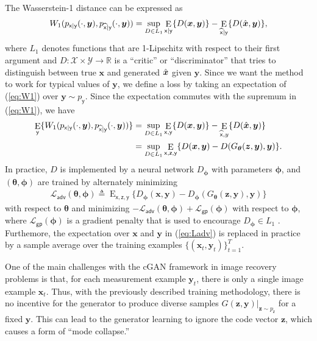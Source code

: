 \documentclass{article}
\theoremstyle{plain}
\theoremstyle{definition}
\theoremstyle{remark}
\renewcommand{\hat}{\widehat}
\newcommand{\defn}{\triangleq}
\newcommand{\hvec}[1]{\ensuremath{\Hat{\boldsymbol{#1}}}}
\renewcommand{\vec}[1]{\ensuremath{\boldsymbol{#1}}}
\newcommand{\mc}[1]{\ensuremath{\mathcal{#1}}}
\newcommand{\Real}{{\mathbb{R}}}
\DeclareMathOperator{\E}{E}
\renewcommand{\eqref}[1]{(\ref{eq:#1})}
\newcommand{\py}{p_{\mathsf{y}}}
\newcommand{\pxgy}{p_{\mathsf{x}|\mathsf{y}}}
\newcommand{\pz}{p_{\mathsf{z}}}
\newcommand{\pxhgy}{p_{\hat{\mathsf{x}}|\mathsf{y}}}
\newcommand{\Ey}{\E_{\mathsf{y}}}
\newcommand{\Exgy}{\E_{\mathsf{x}|\mathsf{y}}}
\newcommand{\Exy}{\E_{\mathsf{x,y}}}
\newcommand{\Exhgy}{\E_{\hat{\mathsf{x}}|\mathsf{y}}}
\newcommand{\Egy}{\E_{\hat{\mathsf{x}},y}}
\newcommand{\Exzy}{\E_{\mathsf{x,z,y}}}
\newcommand{\Ladv}{\mc{L}_{\mathsf{adv}}}
\newcommand{\Lgp}{\mc{L}_{\mathsf{gp}}}
\begin{document}
The Wasserstein-1 distance can be expressed as %
\begin{align}
W_1(\pxgy(\cdot,\vec{y}),\pxhgy(\cdot,\vec{y})) = \sup_{D\in L_1} \Exgy\{D(\vec{x},\vec{y})\} - \Exhgy\{D(\hvec{x},\vec{y})\}
\label{eq:W1},
\end{align}
where $L_1$ denotes functions that are 1-Lipschitz with respect to their first argument and $D:\mc{X}\times\mc{Y}\rightarrow \Real$ is a ``critic'' or ``discriminator'' that tries to distinguish between true $\vec{x}$ and generated $\hvec{x}$ given $\vec{y}$.
Since we want the method to work for typical values of $\vec{y}$, we define a loss by taking an expectation of \eqref{W1} over $\vec{y}\sim\py$.
Since the expectation commutes with the supremum in \eqref{W1},
we have \cite{Adler:18}
\begin{align}
\Ey\{W_1(\pxgy(\cdot,\vec{y}),\pxhgy(\cdot,\vec{y}))\} &= \sup_{D\in L_1} \Exy\{D(\vec{x},\vec{y})\}  - \Egy\{D(\hvec{x},\vec{y})\} \\
&= \sup_{D\in L_1} \Exzy\{D(\vec{x},\vec{y})  - D(G_{\vec{\theta}}(\vec{z},\vec{y}),\vec{y})\}
\label{eq:EW1} .
\end{align}
In practice, $D$ is implemented by a neural network $D_{\vec{\phi}}$ with parameters $\vec{\phi}$, and $(\vec{\theta},\vec{\phi})$ are trained by alternately minimizing
\begin{align}
\Ladv(\vec{\theta},\vec{\phi}) 
\defn \Exzy\{D_{\vec{\phi}}(\vec{x},\vec{y}) - D_{\vec{\phi}}(G_{\vec{\theta}}(\vec{z},\vec{y}),\vec{y})\}
\label{eq:Ladv} 
\end{align}
with respect to $\vec{\theta}$ and minimizing $-\Ladv(\vec{\theta},\vec{\phi}) + \Lgp(\vec{\phi})$ with respect to $\vec{\phi}$, where $\Lgp(\vec{\phi})$ is a gradient penalty that is used to encourage $D_{\vec{\phi}}\in L_1$ \cite{Gulrajani:NIPS:17}.
Furthemore, the expectation over $\vec{x}$ and $\vec{y}$ in \eqref{Ladv} is replaced in practice by a sample average over the training examples $\{(\vec{x}_t,\vec{y}_t)\}_{t=1}^T$.

One of the main challenges with the cGAN framework in image recovery problems is that, for each measurement example $\vec{y}_t$, there is only a single image example $\vec{x}_t$.
Thus, with the previously described training methodology, there is no incentive for the generator to produce diverse samples $G(\vec{z},\vec{y})|_{\vec{z}\sim\pz}$ for a fixed $\vec{y}$.
This can lead to the generator learning to ignore the code vector $\vec{z}$, which causes a form of ``mode collapse.''
\end{document}
